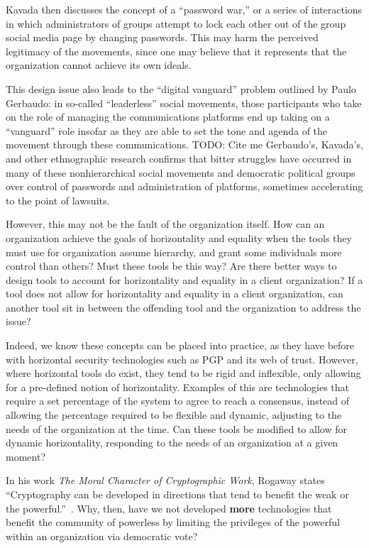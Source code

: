 Kavada then discusses the concept of a ``password war,'' or a series of
interactions in which administrators of groups attempt to lock each other out of
the group social media page by changing passwords. This may harm the perceived
legitimacy of the movements, since one may believe that it represents that the
organization cannot achieve its own ideals.

This design issue also leads to the ``digital vanguard'' problem outlined by
Paulo Gerbaudo: in so-called ``leaderless'' social movements, those participants
who take on the role of managing the communications platforms end up taking on a
``vanguard'' role insofar as they are able to set the tone and agenda of the
movement through these communications.{\color{red} TODO: Cite me} Gerbaudo’s, Kavada's, and other %
ethnographic research confirms that bitter struggles have occurred in many of
these nonhierarchical social movements and democratic political groups over 
control of passwords and administration of platforms, sometimes accelerating to
the point of lawsuits.

However, this may not be the fault of the organization itself. How can an 
organization achieve the goals of horizontality and equality when the tools they
must use for organization assume hierarchy, and grant some individuals more
control than others? Must these tools be this way? Are there better ways to
design tools to account for horizontality and equality in a client organization?
If a tool does not allow for horizontality and equality in a client
organization, can another tool sit in between the offending tool and the
organization to address the issue? 

Indeed, we know these concepts can be placed into practice, as they have before
with horizontal security technologies such as PGP and its web of trust. However,
where horizontal tools do exist, they tend to be rigid and inflexible, only
allowing for a pre-defined notion of horizontality. Examples of this are
technologies that require a set percentage of the system to agree to reach a
consensus, instead of allowing the percentage required to be flexible and
dynamic, adjusting to the needs of the organization at the time. Can these tools
be modified to allow for dynamic horizontality, responding to the needs of an
organization at a given moment?

In his work \textit{The Moral Character of
Cryptographic Work}, Rogaway states ``Cryptography can be developed in
directions that tend to benefit the weak or the
powerful.''~\cite{rogaway2015moral}. Why, then, have we not developed
\textbf{more} technologies that benefit the community of powerless by limiting
the privileges of the powerful within an organization via democratic vote?

